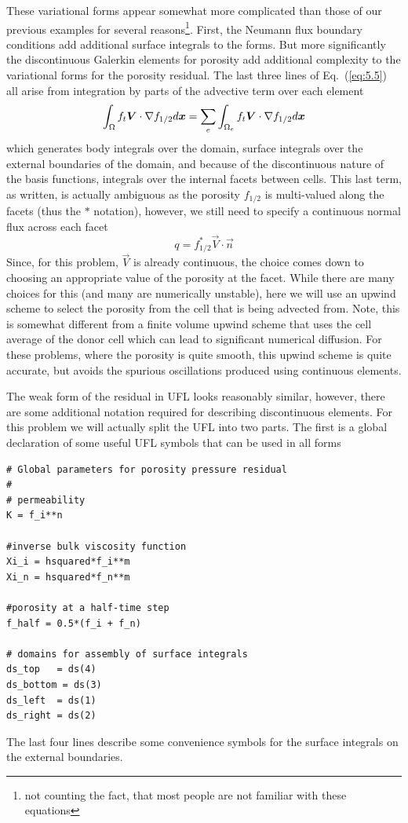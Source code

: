 These variational forms appear somewhat more complicated than those of
our previous examples for several reasons\footnote{not counting the fact, that
most people are not familiar with these equations}.  First,  the
Neumann flux boundary conditions add additional surface integrals to
the forms.  But more significantly the discontinuous Galerkin elements
for porosity add additional complexity to the variational forms for
the porosity residual.  The last three lines of Eq.\ (\ref{eq:5.5}) all arise from
integration by parts of the advective term over each element
\begin{displaymath}
  \int_{\Omega} f_{t}{\mbox{\boldmath$V$}}\cdot\nabla f_{1/2} d{\mbox{\boldmath$x$}} = \sum_e \int_{\Omega_{e}} f_{t}{\mbox{\boldmath$V$}}\cdot\nabla f_{1/2} d{\mbox{\boldmath$x$}}
\end{displaymath}
which generates body integrals over the domain,  surface integrals
over the external boundaries of the domain,  and because of the
discontinuous nature of the basis functions,  integrals over the
internal facets between cells.  This last term, as written, is
actually ambiguous as the porosity
$f_{1/2}$ is  multi-valued along the facets (thus the $*$ notation),
however, we still need to specify a continuous normal flux across each
facet 
\begin{equation}
  \label{eq5:flux}
    q = f_{1/2}^{*}\vec{V}\cdot\vec{n}
\end{equation}
Since, for this problem, $\vec{V}$ is already continuous, the choice
comes down to choosing an appropriate value of the porosity at the
facet. While there are many choices for this (and many are numerically
unstable), here we  will use an upwind scheme to select the
porosity from the cell that is being advected from.  Note, this is
somewhat different from a finite volume upwind scheme that uses the
cell average of the donor cell which can lead to significant numerical
diffusion.  For these problems, where the porosity is quite smooth,
this upwind scheme is quite accurate, but avoids the spurious
oscillations produced using continuous elements.

The weak form of the residual in UFL looks reasonably
similar, however, there are some additional notation required for
describing discontinuous elements.  For this problem we will actually
split the UFL into two parts.  The first is a global declaration of
some useful UFL symbols that can be used in all forms
\begin{lstlisting}[style=UFL]
# Global parameters for porosity pressure residual 
#
# permeability
K = f_i**n

#inverse bulk viscosity function
Xi_i = hsquared*f_i**m
Xi_n = hsquared*f_n**m

#porosity at a half-time step
f_half = 0.5*(f_i + f_n)

# domains for assembly of surface integrals
ds_top   = ds(4)
ds_bottom = ds(3)
ds_left  = ds(1)
ds_right = ds(2)
\end{lstlisting}
The last four lines describe some convenience symbols for the
surface integrals on the external boundaries. 

